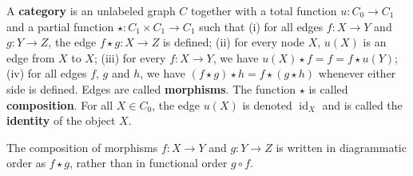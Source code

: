 \begin{definition}
    \label{def:cat}
    A \textbf{category} is an unlabeled graph \( C \) together with a total function \( u : C_0 \mathop{\to} C_1 \) and a partial function \( \star: C_1 \mathop{\times} C_1 \mathop{\to} C_1 \) such that 
        (i) for all edges \( f:X \mathop{\to} Y \) and \( g:Y \mathop{\to} Z \), the edge \( f \mathop{\star} g :X \mathop{\to} Z \) is defined; 
        (ii) for every node \( X \), \( u(X) \) is an edge from \( X \) to \( X \);
        (iii) for every \( f:X \mathop{\to} Y \), we have \(u(X) \mathop{\star} f \mathop{=} f \mathop{=} f \mathop{\star} u(Y)\);
        (iv) for all edges \( f \), \( g \) and \(h\), we have \( (f \mathop{\star} g) \mathop{\star} h \mathop{=} f \mathop{\star} (g \mathop{\star} h) \) whenever either side is defined.
    Edges are called \textbf{morphisms}. The function $\star$ is called \textbf{composition}. For all \( X \mathop{\in} C_0 \), the edge \( u(X) \) is denoted \( \operatorname{id}_X \) and is called the \textbf{identity} of the object \( X \).
\end{definition} 

\begin{notation}
    The composition of morphisms \( f : X \mathop{\to} Y \) and \( g : Y \mathop{\to} Z \) is written in diagrammatic order as \( f \mathop{\star} g \), rather than in functional order \( g \circ f \). 
\end{notation}  

